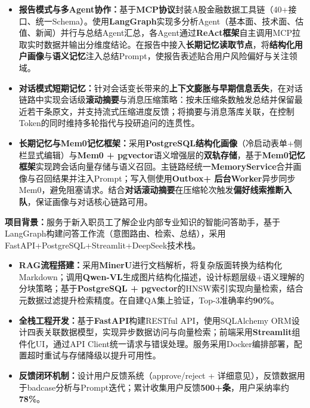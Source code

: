 \begin{itemize}
  \item \textbf{报告模式与多Agent协作：}基于\textbf{MCP协议}封装A股金融数据工具链（40+接口、统一Schema）。使用\textbf{LangGraph}实现多分析Agent（基本面、技术面、估值、新闻）并行与总结Agent汇总，各Agent通过\textbf{ReAct框架}自主调用MCP拉取实时数据并输出分维度结论。在报告中接入\textbf{长期记忆读取节点}，将\textbf{结构化用户画像}与\textbf{语义记忆}注入总结Prompt，使报告表述贴合用户风险偏好与关注领域。
  \item \textbf{对话模式短期记忆：}针对会话变长带来的\textbf{上下文膨胀与早期信息丢失}，在对话链路中实现会话级\textbf{滚动摘要}与消息压缩策略：按未压缩条数触发总结并保留最近若干条原文，并支持流式压缩进度反馈；将摘要与消息落库关联，在控制Token的同时维持多轮指代与投研追问的连贯性。
  \item \textbf{长期记忆与Mem0记忆框架：}采用\textbf{PostgreSQL结构化画像}（冷启动表单+侧栏显式编辑）与\textbf{Mem0 + pgvector}语义增强层的\textbf{双轨存储}，基于\textbf{Mem0记忆框架}实现跨会话向量存储与语义召回。主链路经统一\textbf{MemoryService}合并画像与召回结果并注入Prompt；写入侧使用\textbf{Outbox+ 后台Worker}异步同步Mem0，避免阻塞请求。结合\textbf{对话滚动摘要}在压缩轮次触发\textbf{偏好线索推断入队}，保证画像与对话核心链路可用。
\end{itemize}
  

\textbf{项目背景：}服务于新入职员工了解企业内部专业知识的智能问答助手，基于LangGraph构建问答工作流（意图路由、检索、总结），采用FastAPI+PostgreSQL+Streamlit+DeepSeek技术栈。

\begin{itemize}
  \item \textbf{RAG流程搭建：}采用\textbf{MinerU}进行文档解析，将复杂版面转换为结构化Markdown；调用\textbf{Qwen-VL}生成图片结构化描述，设计标题层级+语义理解的分块策略；基于\textbf{PostgreSQL + pgvector}的HNSW索引实现向量检索，结合元数据过滤提升检索精度。在自建QA集上验证，Top-3准确率约\textbf{90\%}。
  \item \textbf{全栈工程开发：}基于\textbf{FastAPI}构建RESTful API，使用SQLAlchemy ORM设计四表关联数据模型，实现异步数据访问与向量检索；前端采用\textbf{Streamlit}组件化UI，通过API Client统一请求与错误处理。服务采用Docker编排部署，配置超时重试与存储降级以提升可用性。
  \item \textbf{反馈闭环机制：}设计用户反馈系统（approve/reject + 详细意见），反馈数据用于badcase分析与Prompt迭代；累计收集用户反馈\textbf{500+条}，用户采纳率约\textbf{78\%}。
\end{itemize}